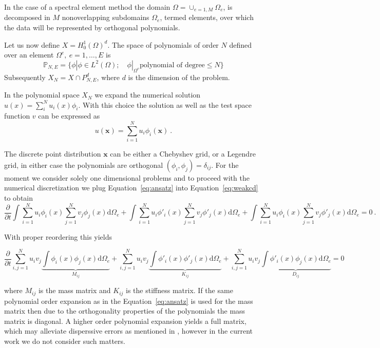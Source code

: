 \documentclass[10pt]{article}
\renewcommand{\d}{\mathrm{d}}
\newcommand{\vect}[1]{\mathbf{#1} }
\begin{document}
In the case of a spectral element method the domain $\Omega=\cup_{e=1,M} \Omega_e $, is decomposed in $M$ nonoverlapping 
subdomains $\Omega_e$, termed elements, over which the data will be represented by orthogonal polynomials.

Let us now define $X=H^1_0(\Omega)^d$. The space of polynomials of order $N$ defined over an element $\Omega^e, \ e=1,\ldots, E$ is
$$
\mathbb P_{N,E}=\lbrace  \phi| \phi \in L^2(\Omega); \quad \phi|_{\Omega^e} \text{polynomial of degree} \leq N\rbrace
$$
Subsequently $X_N=X\cap  P_{N,E}^d$, where $d$ is the dimension of the problem.

In the polynomial space $X_N$ we expand the numerical solution $u(x)=\sum_i^N u_i(x)\phi_i$.
With this choice the solution as well as the test space function $v$ can be expressed as
\begin{equation}
u(\vect x)=\sum_{i=1}^N u_{i}\phi_i(\vect x)\ .
\label{eq:ansatz}
\end{equation}

The discrete point distribution $\mathbf x$ can be either a Chebyshev grid, or a Legendre grid, in either case the polynomials are orthogonal $(\phi_i, \phi_j)=\delta_{ij}$. 
For the moment we consider solely one dimensional problems and to proceed with the numerical discretization we plug Equation~\ref{eq:ansatz} into Equation~\ref{eq:weakcd} to obtain
\begin{equation}
\frac{\partial}{\partial t}\int \sum_{i=1}^N u_{i}\phi_i(x) \sum_{j=1}^N v_{j}\phi_j(x) \d \Omega_e + \int\sum_{i=1}^N u_{i}\phi'_i(x) \sum_{j=1}^N v_{j}\phi'_j(x) \d \Omega_e  +\int\sum_{i=1}^N u_{i}\phi_i(x) \sum_{j=1}^N v_{j}\phi'_j(x) \d \Omega_e =0 \ .
\end{equation}

With proper reordering this yields

\begin{equation}
\frac{\partial}{\partial t}\sum_{i,j=1}^N u_{i}v_{j}\underbrace{\int \phi_i(x)\phi_j(x) \d \Omega_e}_{M_{ij}} + \sum_{i,j=1}^N u_{i} v_{j}\underbrace{\int\phi'_i(x) \phi'_j(x) \d \Omega_e}_{K_{ij}} +\sum_{i,j=1}^N u_{i} v_{j}\underbrace{\int\phi'_i(x) \phi_j(x) \d \Omega_e}_{D_{ij}}  =0
\end{equation}

where $M_{ij}$ is the mass matrix and $K_{ij}$ is the stiffness matrix. If the same polynomial order expansion as in the Equation~\ref{eq:ansatz} is used for the mass matrix then due to the orthogonality properties of the polynomials the mass matrix is diagonal. A higher order polynomial expansion yields a full matrix, which may alleviate disperssive errors as mentioned in \cite{ainsworth2014}, however in the current work we do not consider such matters.
\end{document}
